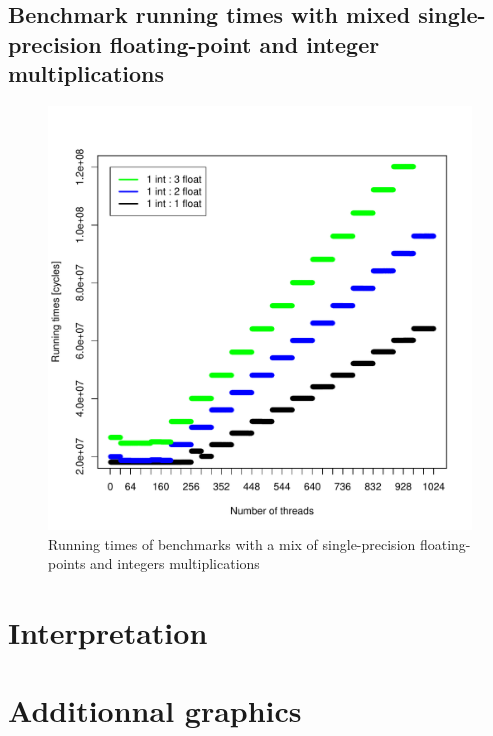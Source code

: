 \documentclass{article}
\def \scalingfactor{.8}
\begin{document}
	\subsection{Benchmark running times with mixed single-precision floating-point and integer multiplications}
	\begin{figure}[h]
		\centering
		\vspace{-20pt}
        \includegraphics[width=\scalingfactor\linewidth]{"graphics/running_times_mixed"}
		\vspace{-15pt}
        \caption{Running times of benchmarks with a mix of single-precision floating-points and integers multiplications}
    \end{figure}
	\pagebreak

\section{Interpretation}

\section{Additionnal graphics}
\end{document}
